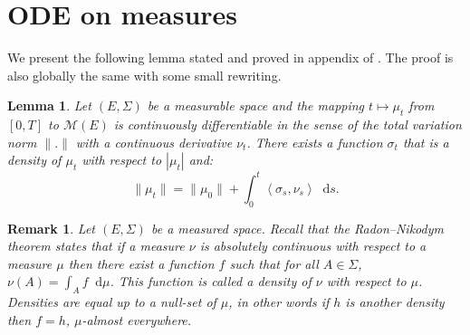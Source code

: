 \documentclass[11pt,a4paper]{article}
\newcommand{\MC}{\mathcal{M}}
\newcommand{\brac}[1]{\left\langle#1\right\rangle}
\newcommand{\dd}{\mathop{}\!\mathrm{d}}
\newtheorem{lemma}[theorem]{Lemma}
\newtheorem{remark}[theorem]{Remark}
\begin{document}
\section{ODE on measures}
We present the following lemma stated and proved in appendix of \cite{kolokoltsov2006kinetic}. The proof is also globally the same with some small rewriting. 
\begin{lemma}\label{lem:ODE_total_variation_kolo}
    Let $(E,\Sigma)$ be a measurable space and the mapping $t \mapsto \mu_t$ from $[0,T]$ to $\MC(E)$ is continuously differentiable in the sense of the total variation norm \(\|.\|\) with a continuous derivative $\nu_t$. There exists a function $\sigma_t$ that is a density of $\mu_t$ with respect to $|\mu_t|$ and:
    \[
   \|\mu_t\|= \|\mu_0\| + \int_0^t \brac{ \sigma_s ,\nu_s} \dd s.
    \]
\end{lemma}
\begin{remark}
    Let $(E,\Sigma)$ be a measured space. Recall that the Radon–Nikodym theorem states that if a measure $\nu$ is absolutely continuous with respect to a measure $\mu$ then there exist a function $f$ such that for all $A \in \Sigma$, $\nu(A) = \int_A f \dd \mu$. This function is called a density of $\nu$ with respect to $\mu$. Densities are equal up to a null-set of $\mu$, in other words if $h$ is another density then $f = h$, $\mu$-almost everywhere.
\end{remark}
\end{document}

